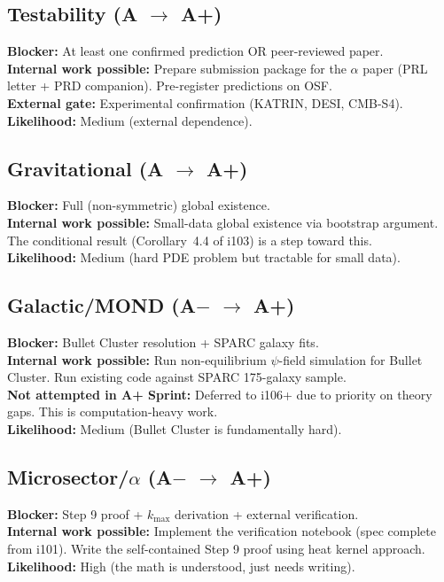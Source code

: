 \documentclass[11pt,a4paper]{article}
\begin{document}
\subsection{Testability (A $\to$ A+)}
\textbf{Blocker:} At least one confirmed prediction OR peer-reviewed paper.\\
\textbf{Internal work possible:} Prepare submission package for the
$\alpha$ paper (PRL letter + PRD companion). Pre-register predictions on OSF.\\
\textbf{External gate:} Experimental confirmation (KATRIN, DESI, CMB-S4).\\
\textbf{Likelihood:} \textcolor{gradeBplus}{Medium} (external dependence).

\subsection{Gravitational (A $\to$ A+)}
\textbf{Blocker:} Full (non-symmetric) global existence.\\
\textbf{Internal work possible:} Small-data global existence via bootstrap argument.
The conditional result (Corollary~4.4 of i103) is a step toward this.\\
\textbf{Likelihood:} \textcolor{gradeBplus}{Medium} (hard PDE problem but tractable for small data).

\subsection{Galactic/MOND (A$-$ $\to$ A+)}
\textbf{Blocker:} Bullet Cluster resolution + SPARC galaxy fits.\\
\textbf{Internal work possible:} Run non-equilibrium $\psi$-field simulation
for Bullet Cluster. Run existing code against SPARC 175-galaxy sample.\\
\textbf{Not attempted in A+ Sprint:} Deferred to i106+ due to priority on
theory gaps. This is computation-heavy work.\\
\textbf{Likelihood:} \textcolor{gradeBplus}{Medium} (Bullet Cluster is fundamentally hard).

\subsection{Microsector/$\alpha$ (A$-$ $\to$ A+)}
\textbf{Blocker:} Step 9 proof + $k_{\max}$ derivation + external verification.\\
\textbf{Internal work possible:} Implement the verification notebook (spec complete
from i101). Write the self-contained Step 9 proof using heat kernel approach.\\
\textbf{Likelihood:} \textcolor{gradeA}{High} (the math is understood, just needs writing).
\end{document}

